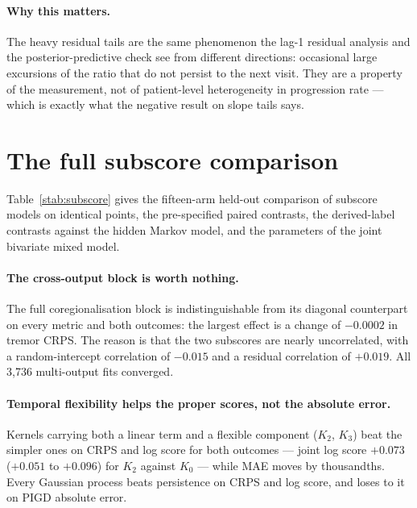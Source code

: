 \paragraph{Why this matters.} The heavy residual tails are the same phenomenon the
lag-1 residual analysis and the posterior-predictive check see from different
directions: occasional large excursions of the ratio that do not persist to the
next visit. They are a property of the measurement, not of patient-level
heterogeneity in progression rate --- which is exactly what the negative result on
slope tails says.

\begin{table}[htbp]
\centering
\caption{Student-t variants of the growth model over seven patient splits. GG,
GT, TG and TT denote Gaussian or Student-t slopes and residuals respectively.}
\label{stab:studentt}
\small

\end{table}

\section{The full subscore comparison}
\label{sup:subscore}

Table~\ref{stab:subscore} gives the fifteen-arm held-out comparison of subscore
models on identical points, the pre-specified paired contrasts, the derived-label
contrasts against the hidden Markov model, and the parameters of the joint
bivariate mixed model.

\paragraph{The cross-output block is worth nothing.} The full coregionalisation
block is indistinguishable from its diagonal counterpart on every metric and both
outcomes: the largest effect is a change of $-0.0002$ in tremor CRPS. The reason
is that the two subscores are nearly uncorrelated, with a random-intercept
correlation of $-0.015$ and a residual correlation of $+0.019$. All 3,736
multi-output fits converged.

\paragraph{Temporal flexibility helps the proper scores, not the absolute error.}
Kernels carrying both a linear term and a flexible component ($K_2$, $K_3$) beat
the simpler ones on CRPS and log score for both outcomes --- joint log score
$+0.073$ ($+0.051$ to $+0.096$) for $K_2$ against $K_0$ --- while MAE moves by
thousandths. Every Gaussian process beats persistence on CRPS and log score, and
loses to it on PIGD absolute error.

